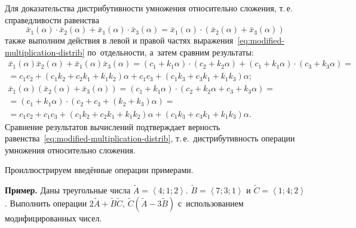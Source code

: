 Для доказательства дистрибутивности умножения относительно сложения, т.\,е. справедливости равенства 
\begin{equation}
\label{eq:modified-multiplication-distrib}
  \bar{x}_1\left(\alpha \right)\cdot \bar{x}_2\left(\alpha \right)+\bar{x}_1\left(\alpha \right)\cdot \bar{x}_3\left(\alpha \right)=\bar{x}_1\left(\alpha \right)\cdot \left(\bar{x}_2(\alpha )+\bar{x}_3(\alpha ) \right)
\end{equation}
также выполним действия в левой и правой частях выражения~\eqref{eq:modified-multiplication-distrib} по~отдельности, а~затем сравним результаты: \allowbreak
\begin{gather*}
  \bar{x}_1\left( \alpha \right)\bar{x}_2\left( \alpha  \right)+\bar{x}_1\left( \alpha  \right)\bar{x}_3\left( \alpha  \right)=(c_1+k_1\alpha )\cdot (c_2+k_2\alpha )+(c_1+k_1\alpha )\cdot (c_3+k_3\alpha )={}\\ 
  {}=c_1c_2+(c_1k_2+c_2k_1+k_1k_2)\alpha +c_1c_3+(c_1k_3+c_3k_1+k_1k_3)\alpha; \\ 
  \bar{x}_1\left( \alpha  \right)\left( \bar{x}_2\left( \alpha  \right)+\bar{x}_3\left( \alpha  \right) \right)=(c_1+k_1\alpha )\cdot (c_2+k_2\alpha +c_3+k_3\alpha )= \\ 
  =\left(c_1+k_1\alpha \right)\cdot \left(c_2+c_3+\left(k_2+k_3\right)\alpha \right)={}\\ 
  {}=c_1c_2+c_1c_3+\left(c_1k_2+c_2k_1+k_1k_2\right)\alpha +\left(c_1k_3+c_3k_1+k_1k_3\right)\alpha.  
\end{gather*}
Сравнение результатов вычислений подтверждает верность равенства~\eqref{eq:modified-multiplication-distrib}, т.\,е.~дистрибутивность операции умножения относительно сложения.

Проиллюстрируем введённые операции примерами.

\textbf{Пример.} Даны треугольные числа $\tilde{A}=\left\langle 4;1;2 \right\rangle $. $\tilde{B}=\left\langle 7;3;1 \right\rangle $ и $\tilde{C}=\left\langle 1;4;2 \right\rangle $. Выполнить операции $2\tilde{A}+\tilde{B}\tilde{C}$, $\tilde{C}\left( \tilde{A}-3\tilde{B} \right)$ с~использованием модифицированных чисел.

